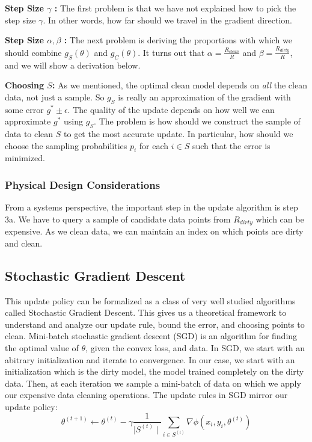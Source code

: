 \vspace{0.5em}

\noindent\textbf{Step Size $\gamma$ : } The first problem is that we have not explained how to pick the step size $\gamma$. In other words, how far should we travel in the gradient direction.

\vspace{0.5em}

\noindent\textbf{Step Size $\alpha,\beta$ : } The next problem is deriving the proportions with which we should combine $g_S(\theta)$ and $g_C(\theta)$. It turns out that $\alpha = \frac{R_{clean}}{R}$ and $\beta = \frac{R_{dirty}}{R}$, and we will show a derivation below.

\vspace{0.5em}

\noindent\textbf{Choosing $S$: } As we mentioned, the optimal clean model depends on \emph{all} the clean data, not just a sample. 
So $g_S$ is really an approximation of the gradient with some error $g^* \pm \epsilon$. 
The quality of the update depends on how well we can approximate $g^*$ using $g_S$.
The problem is how should we construct the sample of data to clean $S$ to get the most accurate update.
In particular, how should we choose the sampling probabilities $p_i$ for each $i \in S$ such that the error is minimized.

\subsubsection{Physical Design Considerations}
From a systems perspective, the important step in the update algorithm is step 3a.
We have to query a sample of candidate data points from $R_{dirty}$ which 
can be expensive.
As we clean data, we can maintain an index on which points are dirty and clean.

\subsection{Stochastic Gradient Descent}\label{sgd}
This update policy can be formalized as a class of very well studied algorithms called Stochastic Gradient Descent.
This gives us a theoretical framework to understand and analyze our update rule, bound the error, and choosing points to clean.
Mini-batch stochastic gradient descent (SGD) is an algorithm for finding the optimal value
of $\theta$, given the convex loss, and data.
In SGD, we start with an abitrary initialization and iterate to convergence.
In our case, we start with an initialization which is the dirty model, the model trained completely on the dirty data.
Then, at each iteration we sample a mini-batch of data on which we apply our expensive data cleaning operations.
The update rules in SGD mirror our update policy:
 \[
 \theta^{(t+1)}\leftarrow\theta^{(t)}-\gamma\frac{1}{\mid S^{(t)}\mid}\sum_{i\in S^{(t)}}\nabla\phi(x_i,y_i,\theta^{(t)})
 \]

